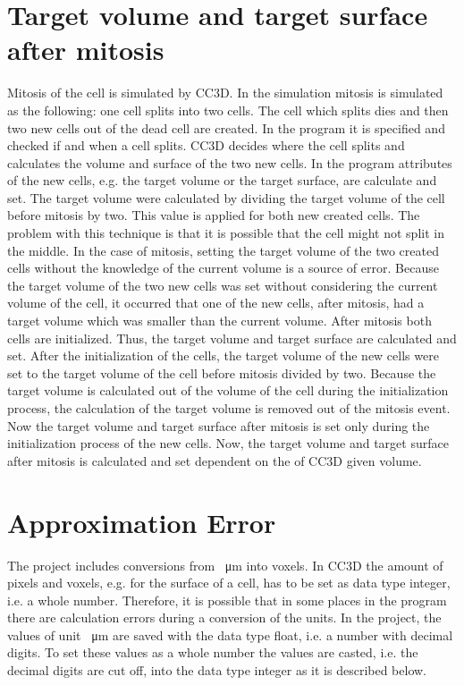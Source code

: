 \section{Target volume and target surface after mitosis} \label{sec:TargetVolumeSurfaceAfterMitosis}
Mitosis of the cell is simulated by \ac{CC3D}. In the simulation mitosis is simulated as the following: one cell splits into two cells. The cell which splits dies and then two new cells out of the dead cell are created. \newline
In the program it is specified and checked if and when a cell splits. \ac{CC3D} decides where the cell splits and calculates the volume and surface of the two new cells. In the program attributes of the new cells, e.g. the target volume or the target surface, are calculate and set. \newline 
The target volume were calculated by dividing the target volume of the cell before mitosis by two. This value is applied for both new created cells. The problem with this technique is that it is possible that the cell might not split in the middle. In the case of mitosis, setting the target volume of the two created cells without the knowledge of the current volume is a source of error. Because the target volume of the two new cells was set without considering the current volume of the cell, it occurred that one of the new cells, after mitosis, had a target volume which was smaller than the current volume. \newline
After mitosis both cells are initialized. Thus, the target volume and target surface are calculated and set. After the initialization of the cells, the target volume of the new cells were set to the target volume of the cell before mitosis divided by two. \newline
Because the target volume is calculated out of the volume of the cell during the initialization process, the calculation of the target volume is removed out of the mitosis event. Now the target volume and target surface after mitosis is set only during the initialization process of the new cells. \newline
Now, the target volume and target surface after mitosis is calculated and set dependent on the of \ac{CC3D} given volume.



\section{Approximation Error} \label{sec:ApproximationError}
The project includes conversions from \SI{}{\micro\metre} into voxels. In \ac{CC3D} the amount of pixels and voxels, e.g. for the surface of a cell, has to be set as data type integer, i.e. a whole number. Therefore, it is possible that in some places in the program there are calculation errors during a conversion of the units. In the project, the values of unit \SI{}{\micro\metre} are saved with the data type float, i.e. a number with decimal digits. To set these values as a whole number the values are casted, i.e. the decimal digits are cut off, into the data type integer as it is described below. 

